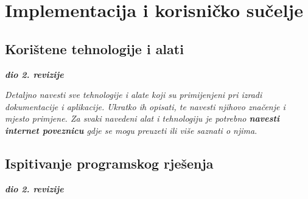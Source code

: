 \chapter{Implementacija i korisničko sučelje}
		
		
		\section{Korištene tehnologije i alati}
		
			\textbf{\textit{dio 2. revizije}}
			
			 \textit{Detaljno navesti sve tehnologije i alate koji su primijenjeni pri izradi dokumentacije i aplikacije. Ukratko ih opisati, te navesti njihovo značenje i mjesto primjene. Za svaki navedeni alat i tehnologiju je potrebno \textbf{navesti internet poveznicu} gdje se mogu preuzeti ili više saznati o njima}.
			
			
			\eject 
		
	
		\section{Ispitivanje programskog rješenja}
			
			\textbf{\textit{dio 2. revizije}}\\
			
			 
			
